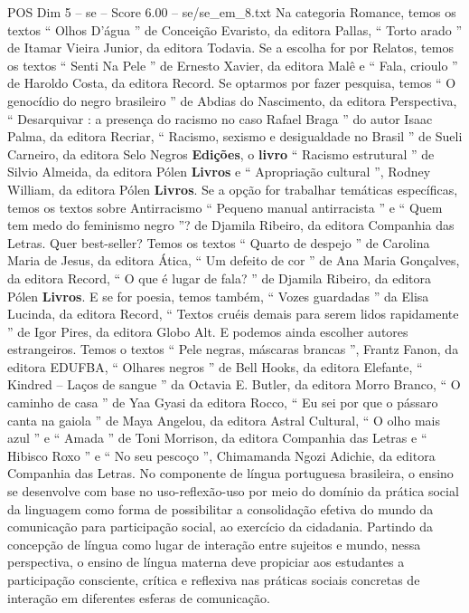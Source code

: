 \begin{textsample}{POS Dim 5 – se – Score 6.00 – se/se\_em\_8.txt}
Na categoria Romance, temos os textos “ Olhos D’água ” de Conceição Evaristo, da editora Pallas, “ Torto arado ” de Itamar Vieira Junior, da editora Todavia.
Se a escolha for por Relatos, temos os textos “ Senti Na Pele ” de Ernesto Xavier, da editora Malê e “ Fala, crioulo ” de Haroldo Costa, da editora Record.
Se optarmos por fazer pesquisa, temos “ O genocídio do negro brasileiro ” de Abdias do Nascimento, da editora Perspectiva, “ Desarquivar : a presença do racismo no caso Rafael Braga ” do autor Isaac Palma, da editora Recriar, “ Racismo, sexismo e desigualdade no Brasil ” de Sueli Carneiro, da editora Selo Negros \textbf{Edições}, o \textbf{livro} “ Racismo estrutural ” de Silvio Almeida, da editora Pólen \textbf{Livros} e “ Apropriação cultural ”, Rodney William, da editora Pólen \textbf{Livros}.
Se a opção for trabalhar temáticas específicas, temos os textos sobre Antirracismo “ Pequeno manual antirracista ” e “ Quem tem medo do feminismo negro ”? de Djamila Ribeiro, da editora Companhia das Letras.
Quer best-seller?
Temos os textos “ Quarto de despejo ” de Carolina Maria de Jesus, da editora Ática, “ Um defeito de cor ” de Ana Maria Gonçalves, da editora Record, “ O que é lugar de fala? ” de Djamila Ribeiro, da editora Pólen \textbf{Livros}.
E se for poesia, temos também, “ Vozes guardadas ” da Elisa Lucinda, da editora Record, “ Textos cruéis demais para serem lidos rapidamente ” de Igor Pires, da editora Globo Alt.
E podemos ainda escolher autores estrangeiros.
Temos o textos “ Pele negras, máscaras brancas ”, Frantz Fanon, da editora EDUFBA, “ Olhares negros ” de Bell Hooks, da editora Elefante, “ Kindred – Laços de sangue ” da Octavia E.
Butler, da editora Morro Branco, “ O caminho de casa ” de Yaa Gyasi da editora Rocco, “ Eu sei por que o pássaro canta na gaiola ” de Maya Angelou, da editora Astral Cultural, “ O olho mais azul ” e “ Amada ” de Toni Morrison, da editora Companhia das Letras e “ Hibisco Roxo ” e “ No seu pescoço ”, Chimamanda Ngozi Adichie, da editora Companhia das Letras.
No componente de língua portuguesa brasileira, o ensino se desenvolve com base no uso-reflexão-uso por meio do domínio da prática social da linguagem como forma de possibilitar a consolidação efetiva do mundo da comunicação para participação social, ao exercício da cidadania.
Partindo da concepção de língua como lugar de interação entre sujeitos e mundo, nessa perspectiva, o ensino de língua materna deve propiciar aos estudantes a participação consciente, crítica e reflexiva nas práticas sociais concretas de interação em diferentes esferas de comunicação.

\end{textsample}
